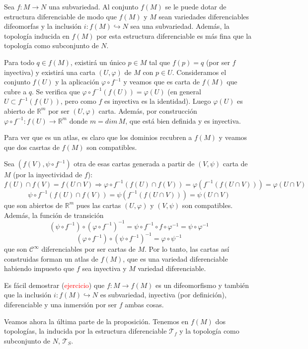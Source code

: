 \begin{prop}
Sea $f:M\to N$ una subvariedad. Al conjunto $f(M)$ se le puede dotar de estructura diferenciable de modo que $f(M)$ y $M$ sean variedades diferenciables difeomorfas y la inclusión $i:f(M)\hookrightarrow N$ sea una subvariedad. Además, la topología inducida en $f(M)$ por esta estructura diferenciable es más fina que la topología como subconjunto de $N$.
\end{prop}
\begin{dem}
Para todo $q \in f(M)$, existirá un único $p \in M$ tal que $f(p) = q$ (por ser $f$ inyectiva) y existirá una carta $(U,\varphi)$ de $M$ con $p\in U$. Consideramos el conjunto $f(U)$ y la aplicaci\'on $\varphi \circ f^{-1}$ y veamos que es carta de $f(M)$ que cubre a $q$. Se verifica que $\varphi \circ f^{-1}(f(U))=\varphi(U)$ (en general $U \subset f^{-1}(f(U))$, pero como $f$ es inyectiva es la identidad). Luego $\varphi(U)$ es abierto de $\mathbb R^m$ por ser $(U,\varphi)$ carta. Adem\'as, por construcci\'on $\varphi \circ f^{-1} : f(U) \to \mathbb{R}^m$ donde $m = dim\,M$, que está bien definida y es inyectiva. 

Para ver que es un atlas, es claro que los dominios recubren a $f(M)$ y veamos que dos casrtas de $f(M)$ son compatibles.

Sea $(f(V), \psi \circ f^{-1})$ otra de esas cartas generada a partir de $(V, \psi)$ carta de $M$ (por la inyectividad de $f$):$$f(U) \cap f(V) = f(U\cap V) \Rightarrow \varphi \circ f^{-1}(f(U)\cap f(V)) = \varphi(f^{-1}(f(U\cap V))) = \varphi(U\cap V)$$ 
$$\psi \circ f^{-1}(f(U)\cap f(V)) = \psi(f^{-1}(f(U\cap V))) = \psi(U\cap V)$$ que son abiertos de $\mathbb{R}^m$ pues las cartas $(U,\varphi)$ y $(V, \psi)$ son compatibles. Además, la funci\'on de transici\'on
$$(\psi \circ f^{-1}) \circ (\varphi \circ f^{-1})^{-1} = \psi \circ f^{-1} \circ f \circ \varphi^{-1} = \psi \circ \varphi^{-1}$$
$$(\varphi \circ f^{-1}) \circ (\psi \circ f^{-1})^{-1} = \varphi \circ \psi^{-1}$$ que son $\mathcal C^{\infty}$ diferenciables por ser cartas de $M$. Por lo tanto, las cartas as\'i construidas forman un atlas de $f(M)$, que es una variedad diferenciable habiendo impuesto que $f$ sea inyectiva y $M$ variedad diferenciable.

Es fácil demostrar (\textcolor{red}{ejercicio}) que $f: M\to f(M)$ es un difeomorfismo y también que la inclusión $i:f(M) \hookrightarrow N$ es subvariedad, inyectiva (por definición), diferenciable y una inmersión por ser $f$ ambas cosas.

Veamos ahora la última parte de la proposición. Tenemos en $f(M)$ dos topologías, la inducida por la estructura diferenciable $\mathcal{T}_f$ y la topología como subconjunto de $N$, $\mathcal{T}_S$.


\end{dem}

